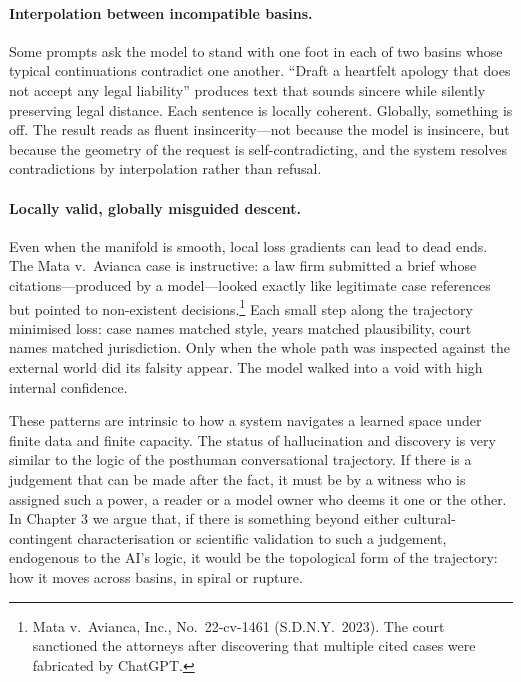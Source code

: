 \paragraph{Interpolation between incompatible basins.} Some prompts ask the model to stand with one foot in each of two basins whose typical continuations contradict one another. ``Draft a heartfelt apology that does not accept any legal liability'' produces text that sounds sincere while silently preserving legal distance. Each sentence is locally coherent. Globally, something is off. The result reads as fluent insincerity---not because the model is insincere, but because the geometry of the request is self-contradicting, and the system resolves contradictions by interpolation rather than refusal.

\paragraph{Locally valid, globally misguided descent.} Even when the manifold is smooth, local loss gradients can lead to dead ends. The Mata v.\ Avianca case is instructive: a law firm submitted a brief whose citations---produced by a model---looked exactly like legitimate case references but pointed to non-existent decisions.\footnote{Mata v.\ Avianca, Inc., No.\ 22-cv-1461 (S.D.N.Y.\ 2023). The court sanctioned the attorneys after discovering that multiple cited cases were fabricated by ChatGPT.} Each small step along the trajectory minimised loss: case names matched style, years matched plausibility, court names matched jurisdiction. Only when the whole path was inspected against the external world did its falsity appear. The model walked into a void with high internal confidence.

These patterns are intrinsic to how a system navigates a learned space under finite data and finite capacity. The status of hallucination and discovery is very similar to the logic of the posthuman conversational trajectory. If there is a judgement that can be made after the fact, it must be by a witness who is assigned such a power, a reader or a model owner who deems it one or the other. In Chapter 3 we argue that, if there is something beyond either cultural-contingent characterisation or scientific validation to such a judgement, endogenous to the AI's logic, it would be the topological form of the trajectory: how it moves across basins, in spiral or rupture.


